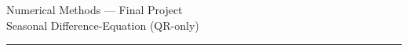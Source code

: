 \documentclass[12pt]{gradescopeexam}
\newcommand{\CourseName}{Numerical Methods — Final Project}
\newcommand{\AssignmentName}{Seasonal Difference-Equation (QR-only)}
\begin{document}
  \thispagestyle{empty}
  \begin{center}
    {\Large \CourseName}\\[0.5em]
    {\large \AssignmentName}\\[0.25em]
    \vspace{0.5em}\rule{0.9\linewidth}{0.4pt}\vspace{0.5em}
  \end{center}
  
  
\end{document}
